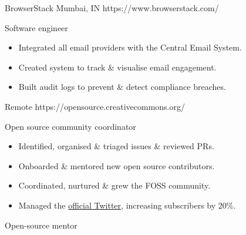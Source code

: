 

\organisationsubsection
  {BrowserStack}
  {Mumbai, IN}
  {https://www.browserstack.com/}

\rolesubsubsection
  {Software engineer}
  {}

\begin{sectiondescription}
  \begin{itemize}[nosep, leftmargin = *]
    \item Integrated all email providers with the Central Email System.
    \item Created system to track \& visualise email engagement.
    \item Built audit logs to prevent \& detect compliance breaches.
  \end{itemize}
\end{sectiondescription}


  {Remote}
  {https://opensource.creativecommons.org/}

\rolesubsubsection
  {Open source community coordinator}
  {}

\begin{sectiondescription}
  \begin{itemize}[nosep, leftmargin = *]
    \item Identified, organised \& triaged issues \& reviewed PRs.
    \item Onboarded \& mentored new open source contributors.
    \item Coordinated, nurtured \& grew the FOSS community.
    \item Managed the \href{https://twitter.com/cc_opensource}{official Twitter}, increasing subscribers by 20\%.
  \end{itemize}
\end{sectiondescription}

\rolesubsubsection
  {Open-source mentor}
  {}

